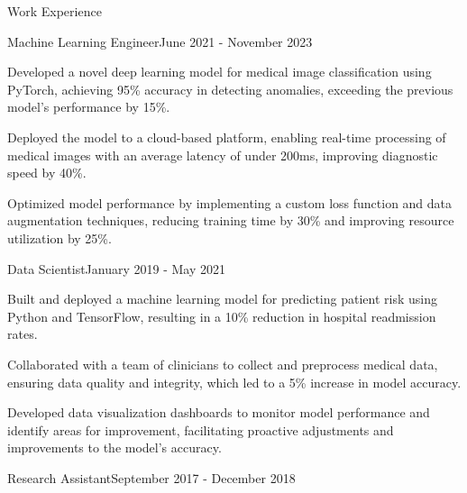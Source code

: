 \documentclass{resume} %
\begin{document}
    \begin{rSection}{Work Experience}
                    \begin{rSubsection}
                {Machine Learning Engineer}{June 2021 - November 2023}
                                    {}
                                {}
                                    \item Developed a novel deep learning model for medical image classification using PyTorch, achieving 95\% accuracy in detecting anomalies, exceeding the previous model's performance by 15\%.
                                    \item Deployed the model to a cloud-based platform, enabling real-time processing of medical images with an average latency of under 200ms, improving diagnostic speed by 40\%.
                                    \item Optimized model performance by implementing a custom loss function and data augmentation techniques, reducing training time by 30\% and improving resource utilization by 25\%.
                            \end{rSubsection}
                    \begin{rSubsection}
                {Data Scientist}{January 2019 - May 2021}
                                    {}
                                {}
                                    \item Built and deployed a machine learning model for predicting patient risk using Python and TensorFlow, resulting in a 10\% reduction in hospital readmission rates.
                                    \item Collaborated with a team of clinicians to collect and preprocess medical data, ensuring data quality and integrity, which led to a 5\% increase in model accuracy.
                                    \item Developed data visualization dashboards to monitor model performance and identify areas for improvement, facilitating proactive adjustments and improvements to the model's accuracy.
                            \end{rSubsection}
                    \begin{rSubsection}
                {Research Assistant}{September 2017 - December 2018}
                                    {}

\end{rSubsection}
\end{rSection}
\end{document}

